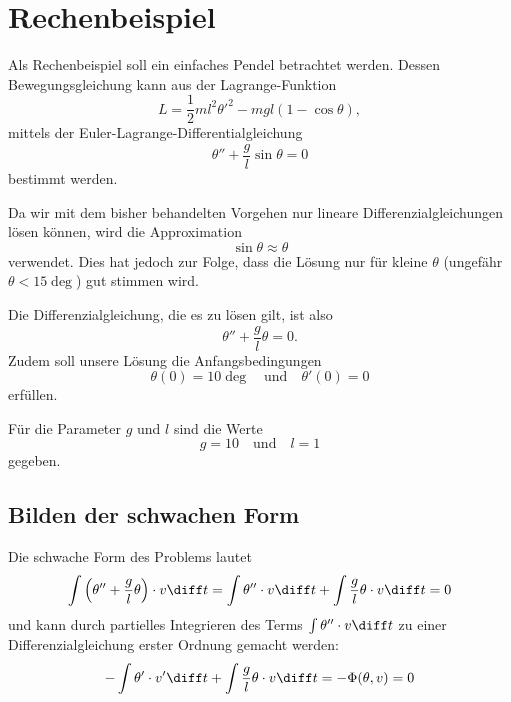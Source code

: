 %
%
%
%
\section{Rechenbeispiel\label{fem:rechenbsp}}

Als Rechenbeispiel soll ein einfaches Pendel betrachtet werden. 
Dessen Bewegungsgleichung kann aus der Lagrange-Funktion
\begin{equation}
    L = \frac{1}{2} m l^2 {\theta'}^2 - m g l (1 - \cos \theta),
\end{equation}
mittels der Euler-Lagrange-Differentialgleichung
\begin{equation}
    \theta'' + \frac{g}{l} \sin \theta = 0
\end{equation}
bestimmt werden.

Da wir mit dem bisher behandelten Vorgehen nur lineare Differenzialgleichungen lösen können, wird die Approximation
\begin{equation}
    \sin \theta \approx \theta
\end{equation}
verwendet.
Dies hat jedoch zur Folge, dass die Lösung nur für kleine $\theta$ (ungefähr $\theta < 15 \deg$) gut stimmen wird.

Die Differenzialgleichung, die es zu lösen gilt, ist also
\begin{equation}
    \theta'' + \frac{g}{l} \theta = 0.
\end{equation}
Zudem soll unsere Lösung die Anfangsbedingungen
\begin{equation}
    \theta(0) = 10 \deg
    \quad \text{und} \quad
    \theta'(0) = 0
\end{equation}
erfüllen.

Für die Parameter $g$ und $l$ sind die Werte
\begin{equation}
    g = 10
    \quad \text{und} \quad
    l = 1
\end{equation}
gegeben.


\subsection{Bilden der schwachen Form}
Die schwache Form des Problems lautet
\begin{equation}
    \int \left( \theta'' + \frac{g}{l} \theta \right) \cdot v \diff t 
    = \int \theta'' \cdot v \diff t + \int \frac{g}{l} \theta \cdot v \diff t
    = 0
\end{equation}
und kann durch partielles Integrieren des Terms $\int \theta'' \cdot v \diff t$ zu einer Differenzialgleichung erster Ordnung gemacht werden:
\begin{equation}
    - \int \theta' \cdot v' \diff t + \int \frac{g}{l} \theta \cdot v \diff t = -\Phi(\theta, v) = 0
    \label{fem:rechenbsp:schwache_form}
\end{equation}


